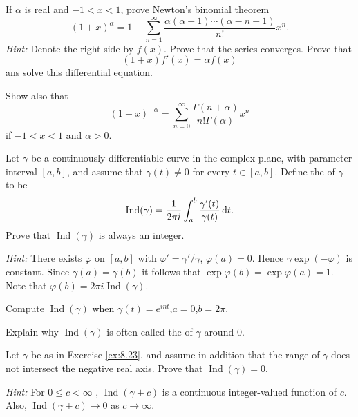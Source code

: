 \begin{myExercise}
    \label{ex:8.22}
    If $\alpha$ is real and $-1 < x < 1$, prove Newton's binomial theorem
    \begin{equation*}
        (1+x)^{\alpha} = 1 + \sum_{n=1}^{\infty}\frac{\alpha(\alpha-1)\cdots(\alpha-n+1)}{n!}x^n .
    \end{equation*}
    \emph{Hint:} Denote the right side by $f(x)$.
    Prove that the series converges.
    Prove that 
    \begin{equation*}
        (1+x)f'(x) = \alpha f(x)
    \end{equation*}
    ans solve this differential equation.

    Show also that 
    \begin{equation*}
        (1-x)^{-\alpha} = \sum_{n=0}^{\infty}\frac{\Gamma(n+\alpha)}{n!\Gamma(\alpha)}x^n
    \end{equation*}
    if $-1<x<1$ and $\alpha>0$.
\end{myExercise}


\begin{myExercise}
    \label{ex:8.23}
    Let $\gamma$ be a continuously differentiable  curve in the complex plane, 
    with parameter interval $[a, b]$, 
    and assume that $\gamma(t) \neq 0$ for every $t \in [a, b]$. 
    Define the  of $\gamma$ to be 
    \begin{equation*}
        \operatorname{Ind}(\gamma) = \frac{1}{2\pi i}
        \int_{a}^{b} \frac{\gamma'(t)}{\gamma(t)} \d t.
    \end{equation*}
    Prove that $\operatorname{Ind}(\gamma)$ is always an integer.

    \emph{Hint:} There exists $\varphi$ on $[a,b]$ with $\varphi' = \gamma'/\gamma$, $\varphi(a)=0$.
    Hence $\gamma \exp(-\varphi)$ is constant. 
    Since $\gamma(a)=\gamma(b)$ it follows that $\exp\varphi(b)=\exp\varphi(a)=1$.
    Note that $\varphi(b)=2\pi i \operatorname{Ind}(\gamma)$.

    Compute $\operatorname{Ind}(\gamma)$ when $\gamma(t)=e^{int}$,$a=0$,$b=2\pi$.

    Explain why $\operatorname{Ind}(\gamma)$ is often called the  of $\gamma$ around 0.
\end{myExercise}


\begin{myExercise}
    \label{ex:8.24}
    Let $\gamma$ be as in Exercise \ref{ex:8.23}, and assume in addition that the range of $\gamma$ does not intersect the negative real axis. 
    Prove that $\operatorname{Ind} (\gamma) = 0$. 

    \emph{Hint:} For $0 \leq c < \infty$ ,
    $\operatorname{Ind} (\gamma + c)$ is a continuous integer-valued function of $c$. 
    Also, $\operatorname{Ind} (\gamma + c) \rightarrow 0$
    as $c \rightarrow \infty$.
\end{myExercise}


